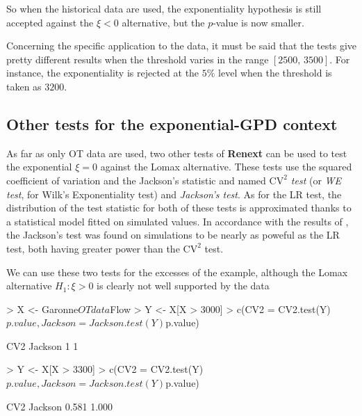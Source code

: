\documentclass[a4paper]{report}
\newcommand{\pkg}[1]{\textbf{#1}}
\begin{document}
\noindent 
So when the historical data are used, the exponentiality hypothesis
is still accepted against the $\xi < 0$ alternative, but the 
$p$-value is now smaller. 


Concerning the specific application to the \verb@Garonne@ data, it
must be said that the tests give pretty different results when the
threshold varies in the range $[2500, \,3500]$. For instance,
the exponentiality is rejected at the $5\%$ level when the 
threshold is taken as $3200$.

\subsection{Other tests for  the exponential-GPD context}
As far as only OT data are used, two other tests of \pkg{Renext} can
be used to test the exponential $\xi = 0$ against the Lomax
alternative. These tests use the squared coefficient of variation
and the Jackson's statistic and named
\textit{$\mathrm{CV}^2$ test} 
(or \textit{WE test}, for Wilk's Exponentiality test) and
\textit{Jackson's test}. As for the LR test, the distribution of the test
statistic for both of these tests is approximated thanks to a
statistical model fitted on simulated values.  In accordance with the
results of \citet{Kozubowski}, the Jackson's test was found on
simulations to be nearly as poweful as the LR test, both having
greater power than the $\mathrm{CV}^2$ test.

We can use these two tests for the excesses of the \verb@Garonne@
example, although the Lomax alternative $H_1: \xi > 0$ is clearly
not well supported by the data

\begin{Schunk}
\begin{Sinput}
> X <- Garonne$OTdata$Flow
> Y <- X[X > 3000]
> c(CV2 = CV2.test(Y)$p.value, Jackson = Jackson.test(Y)$p.value)
\end{Sinput}
\begin{Soutput}
    CV2 Jackson 
      1       1 
\end{Soutput}
\begin{Sinput}
> Y <- X[X > 3300]
> c(CV2 = CV2.test(Y)$p.value, Jackson = Jackson.test(Y)$p.value)
\end{Sinput}
\begin{Soutput}
    CV2 Jackson 
  0.581   1.000 
\end{Soutput}
\end{Schunk}
\end{document}
